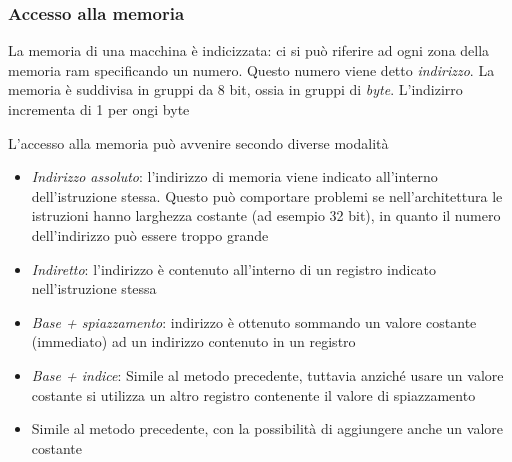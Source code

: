 \subsubsection*{Accesso alla memoria}
\begin{minipage}[c]{0.30\textwidth}
\end{minipage}
%
\begin{minipage}[c]{0.65\textwidth}
	La memoria di una macchina è indicizzata: ci si può riferire ad ogni zona della memoria ram specificando un numero. Questo numero viene detto \textit{indirizzo}. La memoria è suddivisa in gruppi da 8 bit, ossia in gruppi di \textit{byte}. L'indizirro incrementa di 1 per ongi byte
\end{minipage}
\vskip3mm
L'accesso alla memoria può avvenire secondo diverse modalità
\begin{itemize}
	\item \textit{Indirizzo assoluto}: l'indirizzo di memoria viene indicato all'interno dell'istruzione stessa. Questo può comportare problemi se nell'architettura le istruzioni hanno larghezza costante (ad esempio 32 bit), in quanto il numero dell'indirizzo può essere troppo grande
	\item \textit{Indiretto}: l'indirizzo è contenuto all'interno di un registro indicato nell'istruzione stessa
	\item \textit{Base + spiazzamento}: indirizzo è ottenuto sommando un valore costante (immediato) ad un indirizzo contenuto in un registro
	\item \textit{Base + indice}: Simile al metodo precedente, tuttavia anziché usare un valore costante si utilizza un altro registro contenente il valore di spiazzamento
	\item Simile al metodo precedente, con la possibilità di aggiungere anche un valore costante
\end{itemize}
